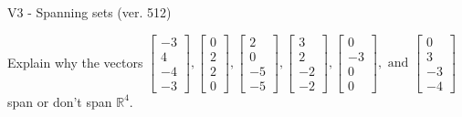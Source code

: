 \begin{exercise}
  \begin{exerciseTitle}V3 - Spanning sets (ver. 512)\end{exerciseTitle}
  \begin{exerciseStatement}
    Explain why the vectors \(\left[\begin{array}{r}
-3 \\
4 \\
-4 \\
-3
\end{array}\right] , \left[\begin{array}{r}
0 \\
2 \\
2 \\
0
\end{array}\right] , \left[\begin{array}{r}
2 \\
0 \\
-5 \\
-5
\end{array}\right] , \left[\begin{array}{r}
3 \\
2 \\
-2 \\
-2
\end{array}\right] , \left[\begin{array}{r}
0 \\
-3 \\
0 \\
0
\end{array}\right] , \text{ and } \left[\begin{array}{r}
0 \\
3 \\
-3 \\
-4
\end{array}\right]\) span or don't span \(\mathbb{R}^4\). 
	



\end{exerciseStatement}
\end{exercise}
